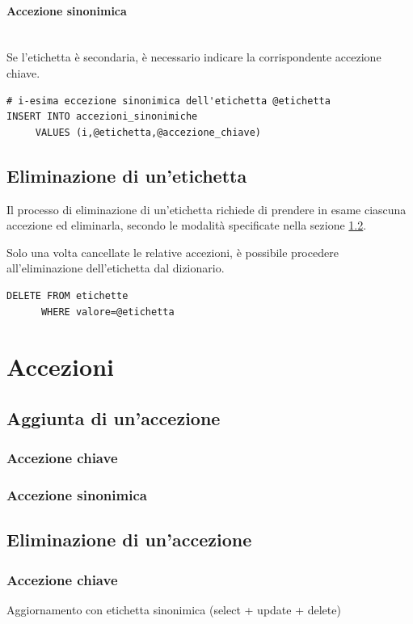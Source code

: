 \documentclass[10pt,a4paper,headinclude,footinclude,hidelinks]{scrreprt} %
\begin{document}
	\paragraph{Accezione sinonimica} \hfill \\
	Se l'etichetta è secondaria, è necessario indicare la corrispondente accezione chiave.
\begin{verbatim}
# i-esima eccezione sinonimica dell'etichetta @etichetta
INSERT INTO accezioni_sinonimiche
     VALUES (i,@etichetta,@accezione_chiave)
\end{verbatim}

	\subsection{Eliminazione di un'etichetta}
	Il processo di eliminazione di un'etichetta richiede di prendere in esame ciascuna accezione ed eliminarla, secondo le modalità specificate nella sezione \ref{ch:stage:er:operazioni:accezioni:eliminazione}.

	Solo una volta cancellate le relative accezioni, è possibile procedere all'eliminazione dell'etichetta dal dizionario.
\begin{verbatim}
DELETE FROM etichette
      WHERE valore=@etichetta
\end{verbatim}

	\section{Accezioni}
	\label{ch:stage:er:operazioni:accezioni}
	\subsection{Aggiunta di un'accezione}
	\subsubsection{Accezione chiave}
	\subsubsection{Accezione sinonimica}
	\subsection{Eliminazione di un'accezione}
	\label{ch:stage:er:operazioni:accezioni:eliminazione}
	\subsubsection{Accezione chiave}
	Aggiornamento con etichetta sinonimica (select + update + delete)
\end{document}
